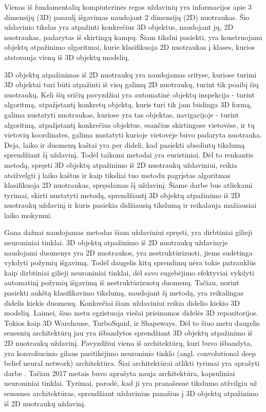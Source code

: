 
Vienas iš fundamentalių kompiuterinės regos uždavinių yra informacijos apie 3 dimensijų (3D) pasaulį išgavimas naudojant 2 dimensijų (2D) nuotraukas. Šio uždavinio tikslas yra atpažinti konkrečius 3D objektus, naudojant jų, 2D nuotraukas, padarytas iš skirtingų kampų. Šiam tikslui pasiekti, yra konstruojami objektų atpažinimo algoritmai, kurie klasifikuoja 2D nuotraukas į klases, kurios atstovauja vieną iš 3D objektų modelių.

3D objektų atpažinimas iš 2D nuotraukų yra naudojamas srityse, kuriose turimi 3D objektai turi būti atpažinti iš visų galimų 2D nuotraukų, turint tik poaibį šių nuotraukų. Keli šių sričių pavyzdžiai yra automatinė objektų inspekcija - turint algoritmą, atpažįstantį konkretų objektą, kuris turi tik jam būdinga 3D formą, galima nustatyti nuotraukas, kuriose yra tas objektas, navigacijoje - turint algoritmą, atpažįstantį konkrečius objektus, esančius skirtingose vietovėse, ir tų vietovių koordinates, galima nustatyti kurioje vietovėje buvo padaryta nuotrauka. Deja, laiko ir duomenų kaštai yra per dideli, kad pasiekti absoliutų tikslumą sprendžiant šį uždavinį. Todėl taikomi metodai yra euristiniai. Dėl to renkantis metodą, spręsti 3D objektų atpažinimo iš 2D nuotraukų uždaviniui, reikia atsižvelgti į laiko kaštus ir kaip tiksliai tuo metodu pagrįstas algoritmas klasifikuoja 2D nuotraukas, spręsdamas šį uždavinį. Šiame darbe bus atliekami tyrimai, skirti nustatyti metodą, sprendžiantį 3D objektų atpažinimo iš 2D nuotraukų uždavinį ir kuris pasiekia didžiausią tikslumą ir reikalauja mažiausiai laiko mokymui.

Gana dažnai naudojamas metodas šiam uždaviniui spręsti, yra dirbtiniai gilieji neuroniniai tinklai. 3D objektų atpažinimo iš 2D nuotraukų uždavinyje naudojami duomenys yra 2D nuotraukos, yra nestruktūrizuoti, jiems sudėtinga vykdyti požymių išgavimą. Todėl daugelis kitų sprendimų nėra tokie patrauklūs kaip dirbtiniai gilieji neuroniniai tinklai, dėl savo sugebėjimo efektyviai vykdyti automatinį požymių išgavimą iš nestruktūrizuotų duomenų. Tačiau, norint pasiekti aukštą klasifikavimo tikslumą, naudojant šį metodą, yra reikalingas didelis kiekis duomenų. Konkrečiai šiam uždaviniui reikia didelio kiekio 3D modelių. Laimei, šiuo metu egzistuoja viešai prieinamos didelės 3D repozitorijos. Tokios kaip 3D Warehouse, TurboSquid, ir Shapeways. Dėl to šiuo metu daugelis senesnių architektūrų jau yra išbandytos sprendžiant 3D objektų atpažinimo iš 2D nuotraukų uždavinį. Pavyzdžiui viena iš architektūrų, kuri buvo išbandyta, yra konvoliucinio gilaus pasitikėjimo neuroninio tinklo (angl. convolutional deep belief neural network) architektūra. Šiai architektūrai atlikti tyrimai yra aprašyti darbe \cite{dbnExp}. Tačiau 2017 metais buvo aprašyta nauja architektūra, kapsuliniai neuroniniai tinklai. Tyrimai, parodė, kad ji yra pranašesnė tikslumo atžvilgiu už senesnes architektūras, sprendžiant uždavinius panašius į 3D objektų atpažinimo iš 2D nuotraukų uždavinį.

